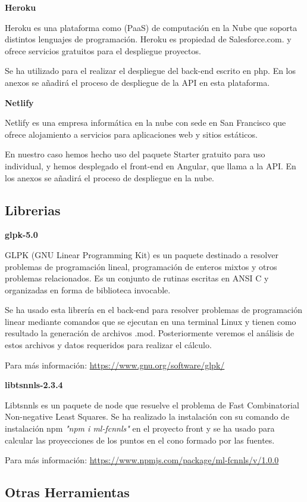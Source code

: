 \textbf{Heroku}

Heroku es una plataforma como  (PaaS) de computación en la Nube que soporta distintos lenguajes de programación. Heroku es propiedad de Salesforce.com. y ofrece servicios gratuitos para el despliegue proyectos.

Se ha utilizado para el realizar el despliegue del back-end escrito en php. En los anexos se añadirá el proceso de despliegue de la API en esta plataforma.

\textbf{Netlify}

Netlify es una empresa  informática en la nube con sede en San Francisco que ofrece alojamiento a servicios para aplicaciones web y sitios estáticos.

En nuestro caso hemos hecho uso del paquete Starter gratuito para uso individual, y hemos desplegado el front-end en Angular, que llama a la API. En los anexos se añadirá el  proceso de despliegue en la nube.

\subsection{Librerias}

\textbf{glpk-5.0}

GLPK  (GNU Linear Programming Kit) es un paquete destinado a resolver problemas de programación lineal, programación de enteros mixtos y otros problemas relacionados. Es un conjunto de rutinas  escritas en ANSI C y organizadas en forma de biblioteca invocable.

Se ha usado esta  librería en el back-end para resolver problemas de programación  linear mediante comandos que se ejecutan en una terminal Linux y tienen como resultado la generación de archivos .mod. Posteriormente veremos el análisis de estos archivos y datos requeridos para realizar el cálculo.

Para más información: \url{https://www.gnu.org/software/glpk/}

\textbf{libtsnnls-2.3.4}

Libtsnnls es un paquete de node que resuelve el problema de Fast Combinatorial Non-negative Least Squares. Se ha realizado la instalación con su comando  de instalación npm \textit{"npm i ml-fcnnls"} en el proyecto front y se ha usado para calcular las proyecciones de los puntos en el cono formado por las fuentes.

Para más información: \url{https://www.npmjs.com/package/ml-fcnnls/v/1.0.0}


\subsection{Otras Herramientas}

